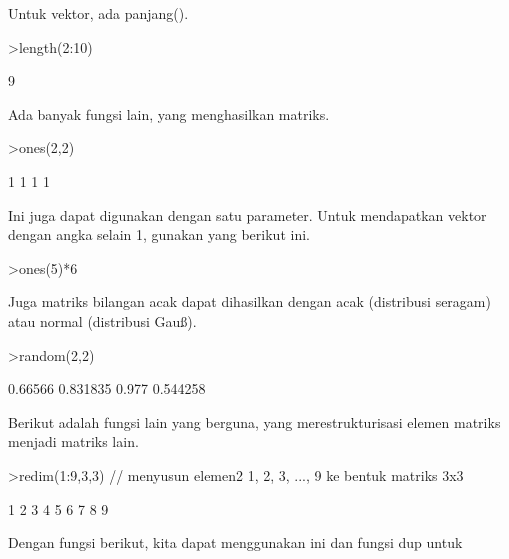 \documentclass[a4paper,10pt]{article}
\begin{document}
\begin{eulernotebook}
\begin{eulercomment}
\begin{eulercomment}
\begin{eulercomment}
\begin{eulercomment}
\begin{eulercomment}
\begin{eulercomment}
\begin{eulercomment}
Untuk vektor, ada panjang().
\end{eulercomment}
\begin{eulerprompt}
>length(2:10)
\end{eulerprompt}
\begin{euleroutput}
  9
\end{euleroutput}
\begin{eulercomment}
Ada banyak fungsi lain, yang menghasilkan matriks.
\end{eulercomment}
\begin{eulerprompt}
>ones(2,2)
\end{eulerprompt}
\begin{euleroutput}
              1             1 
              1             1 
\end{euleroutput}
\begin{eulercomment}
Ini juga dapat digunakan dengan satu parameter. Untuk mendapatkan
vektor dengan angka selain 1, gunakan yang berikut ini.
\end{eulercomment}
\begin{eulerprompt}
>ones(5)*6
\end{eulerprompt}
\begin{euleroutput}
  [6,  6,  6,  6,  6]
\end{euleroutput}
\begin{eulercomment}
Juga matriks bilangan acak dapat dihasilkan dengan acak (distribusi
seragam) atau normal (distribusi Gauß).
\end{eulercomment}
\begin{eulerprompt}
>random(2,2)
\end{eulerprompt}
\begin{euleroutput}
        0.66566      0.831835 
          0.977      0.544258 
\end{euleroutput}
\begin{eulercomment}
Berikut adalah fungsi lain yang berguna, yang merestrukturisasi elemen
matriks menjadi matriks lain.
\end{eulercomment}
\begin{eulerprompt}
>redim(1:9,3,3) // menyusun elemen2 1, 2, 3, ..., 9 ke bentuk matriks 3x3
\end{eulerprompt}
\begin{euleroutput}
              1             2             3 
              4             5             6 
              7             8             9 
\end{euleroutput}
\begin{eulercomment}
Dengan fungsi berikut, kita dapat menggunakan ini dan fungsi dup untuk

\end{eulercomment}
\end{eulercomment}
\end{eulercomment}
\end{eulercomment}
\end{eulercomment}
\end{eulercomment}
\end{eulercomment}
\end{eulernotebook}
\end{document}
